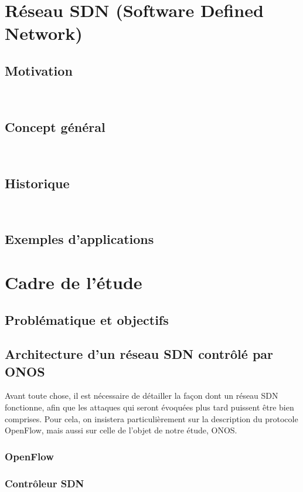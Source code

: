 \documentclass[11pt]{article}
\begin{document}
\newpage
\tableofcontents


\newpage
{}
\section{Réseau SDN (Software Defined Network)}
	\subsection{Motivation}
		
		~\\
	\subsection{Concept général}
		
		~\\
	\subsection{Historique}
		
		~\\
	\subsection{Exemples d'applications}
		
\newpage
{}
\section{Cadre de l'étude}
	\subsection{Problématique et objectifs}
		
	\subsection{Architecture d'un réseau SDN contrôlé par ONOS}
		Avant toute chose, il est nécessaire de détailler la façon dont un réseau SDN fonctionne, afin que les attaques qui seront évoquées plus tard puissent être bien comprises. Pour cela, on insistera particulièrement sur la description du protocole OpenFlow, mais aussi sur celle de l'objet de notre étude, ONOS.
		\subsubsection{OpenFlow}
			
		\subsubsection{Contrôleur SDN}
			
\end{document}
